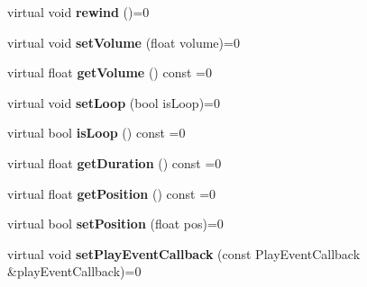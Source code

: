 \begin{DoxyCompactItemize}
virtual void {\bfseries rewind} ()=0
\item 
\mbox{\label{classcocos2d_1_1experimental_1_1IAudioPlayer_a7ff24eee62948fbc14459afea392c5e6}} 
virtual void {\bfseries set\+Volume} (float volume)=0
\item 
\mbox{\label{classcocos2d_1_1experimental_1_1IAudioPlayer_a19d1a1512529d55a69d8024aa54c3dbb}} 
virtual float {\bfseries get\+Volume} () const =0
\item 
\mbox{\label{classcocos2d_1_1experimental_1_1IAudioPlayer_a3f7318cef627c357232a898f7a1eefb2}} 
virtual void {\bfseries set\+Loop} (bool is\+Loop)=0
\item 
\mbox{\label{classcocos2d_1_1experimental_1_1IAudioPlayer_a5422eca63c8a5294d4aa529f0d2fd640}} 
virtual bool {\bfseries is\+Loop} () const =0
\item 
\mbox{\label{classcocos2d_1_1experimental_1_1IAudioPlayer_ae4a4656ccb4168b63c7e059e496a6218}} 
virtual float {\bfseries get\+Duration} () const =0
\item 
\mbox{\label{classcocos2d_1_1experimental_1_1IAudioPlayer_af046c697e9a8ae25670952b2f6d08e07}} 
virtual float {\bfseries get\+Position} () const =0
\item 
\mbox{\label{classcocos2d_1_1experimental_1_1IAudioPlayer_acc5e6a1ea99bcddfd15f3504a0735ff6}} 
virtual bool {\bfseries set\+Position} (float pos)=0
\item 
\mbox{\label{classcocos2d_1_1experimental_1_1IAudioPlayer_a79bb5b911fae80de33291817696cb474}} 
virtual void {\bfseries set\+Play\+Event\+Callback} (const Play\+Event\+Callback \&play\+Event\+Callback)=0
\item 
\mbox{\label{classcocos2d_1_1experimental_1_1IAudioPlayer_a0485a8d972862f0b89e5caaaedbc54d8}} 

\end{DoxyCompactItemize}
